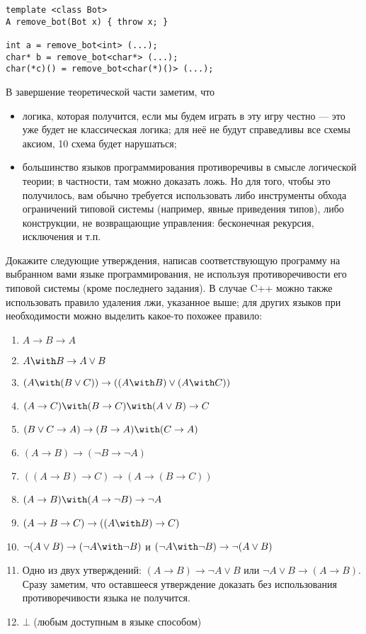 \documentclass[10pt,a4paper,oneside]{article}
\begin{document}
\begin{enumerate}
\begin{verbatim}
template <class Bot>
A remove_bot(Bot x) { throw x; }

int a = remove_bot<int> (...);
char* b = remove_bot<char*> (...);
char(*c)() = remove_bot<char(*)()> (...);
\end{verbatim}

В завершение теоретической части заметим, что 
\begin{itemize}
\item логика, которая получится, если мы будем играть в эту игру честно --- это уже будет не классическая логика; для неё не будут справедливы все
схемы аксиом, 10 схема будет нарушаться;
\item большинство языков программирования противоречивы в смысле логической теории; в частности, там можно доказать ложь.
Но для того, чтобы это получилось, вам обычно требуется использовать либо инструменты обхода ограничений типовой системы
(например, явные приведения типов), либо конструкции, не возвращающие управления: бесконечная рекурсия, исключения и т.п.
\end{itemize}

Докажите следующие утверждения, написав соответствующую программу на выбранном вами языке программирования,
не используя противоречивости его типовой системы (кроме последнего задания). В случае C++ можно также
использовать правило удаления лжи, указанное выше; для других языков при необходимости можно выделить какое-то похожее правило:
\begin{enumerate}
\item $A \rightarrow B \rightarrow A$
\item $A \with B \rightarrow A \vee B$
\item $(A \with (B \vee C)) \rightarrow ((A \with B) \vee (A \with C))$
\item $(A \rightarrow C) \with (B \rightarrow C) \with (A \vee B) \rightarrow C$
\item $(B \vee C \rightarrow A) \rightarrow (B \rightarrow A) \with (C \rightarrow A)$
\item $(A \rightarrow B) \rightarrow (\neg B \rightarrow \neg A)$
\item $((A \rightarrow B) \rightarrow C) \rightarrow (A \rightarrow (B \rightarrow C))$
\item $(A \rightarrow B) \with (A \rightarrow \neg B) \rightarrow \neg A$
\item $(A \rightarrow B \rightarrow C) \rightarrow ((A \with B) \rightarrow C)$
\item $\neg (A \vee B) \rightarrow (\neg A \with \neg B)$ и $(\neg A \with \neg B) \rightarrow \neg (A \vee B)$
\item Одно из двух утверждений: $(A \rightarrow B) \rightarrow \neg A \vee B$ или
$\neg A \vee B \rightarrow (A \rightarrow B)$. Сразу заметим, что оставшееся утверждение доказать
без использования противоречивости языка не получится.
\item $\bot$ (любым доступным в языке способом)
\end{enumerate}


\end{enumerate}
\end{document}
